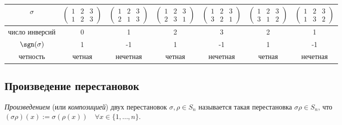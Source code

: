 \begin{table}[!ht]
    \begin{tabular}{c|c|c|c|c|c|c}
        $\sigma$ & $\begin{pmatrix} 1 & 2 & 3 \\ 1 & 2 & 3 \end{pmatrix}$ & $\begin{pmatrix} 1 & 2 & 3 \\ 2 & 1 & 3 \end{pmatrix}$ & $\begin{pmatrix} 1 & 2 & 3 \\ 2 & 3 & 1 \end{pmatrix}$ & $\begin{pmatrix} 1 & 2 & 3 \\ 3 & 2 & 1 \end{pmatrix}$ & $\begin{pmatrix} 1 & 2 & 3 \\ 3 & 1 & 2 \end{pmatrix}$ & $\begin{pmatrix} 1 & 2 & 3 \\ 1 & 3 & 2 \end{pmatrix}$ \\
        \hline
        число инверсий & 0 & 1 & 2 & 3 & 2 & 1\\
        \hline
        $\sgn(\sigma)$ & 1 & -1 & 1 & -1 & 1 & -1 \\
        \hline
        четность & четная & нечетная & четная & нечетная & четная & нечетная
    \end{tabular}
\end{table}

\begin{comment}
    число инверсий в $\sigma \in S_n \leq \binom{n}{2} = \frac{n(n-1)}{2}$, равенство достигается при
    $\sigma = \begin{pmatrix}
        1 & 2 & \dots & n \\
        n & n-1 & \dots & 1
    \end{pmatrix}$
\end{comment}


\subsection{Произведение перестановок}
\begin{definition}
    \textit{Произведением} (или \textit{композицией}) двух перестановок $\sigma, \rho \in S_n$ называется такая перестановка $\sigma \rho \in S_n$, что $(\sigma \rho)(x) := \sigma (\rho (x)) \quad \forall x \in \{1, \dots, n\}$.
\end{definition}


